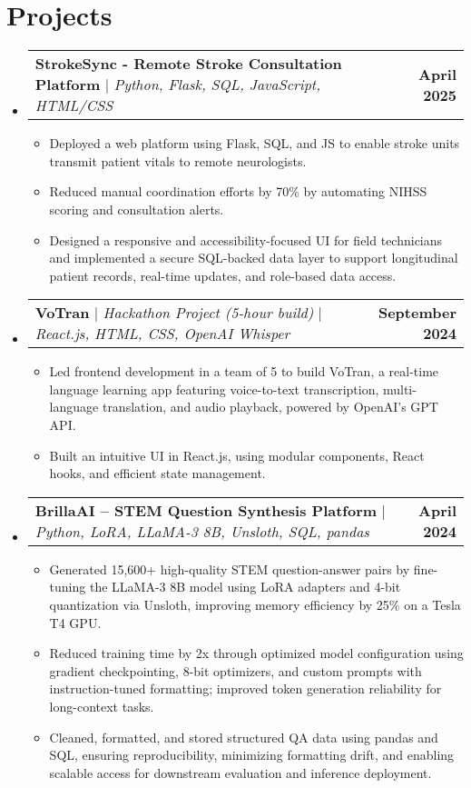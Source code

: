 \documentclass[letterpaper,11pt]{article}
\makeatletter
\newcommand{\resumeItem}[1]{
  \item\small{
    {#1 \vspace{-2pt}}
  }
}
\newcommand{\resumeProjectHeading}[2]{
    \item
    \begin{tabular*}{1.001\textwidth}{l@{\extracolsep{\fill}}r}
      \small#1 & \textbf{\small #2}\\
    \end{tabular*}\vspace{-7pt}
}
\newcommand{\resumeSubHeadingListStart}{\begin{itemize}[leftmargin=0.0in, label={}]}
\newcommand{\resumeSubHeadingListEnd}{\end{itemize}}
\newcommand{\resumeItemListStart}{\begin{itemize}}
\newcommand{\resumeItemListEnd}{\end{itemize}\vspace{-5pt}}
\makeatother
\begin{document}
\section{Projects}
    \vspace{-5pt}
    \resumeSubHeadingListStart
      \resumeProjectHeading
          {\textbf{StrokeSync - Remote Stroke Consultation Platform} $|$ \emph{Python, Flask, SQL, JavaScript, HTML/CSS}}{April 2025}
          \resumeItemListStart
            \resumeItem{Deployed a web platform using Flask, SQL, and JS to enable stroke units transmit patient vitals to remote neurologists.} 
            \resumeItem{Reduced manual coordination efforts by 70\% by automating NIHSS scoring and consultation alerts.}
            \resumeItem{Designed a responsive and accessibility-focused UI for field technicians and implemented a secure SQL-backed data layer to support longitudinal patient records, real-time updates, and role-based data access.} %
          \resumeItemListEnd
          \vspace{-13pt}
      \resumeProjectHeading
          {\textbf{VoTran} $|$ \emph{Hackathon Project (5-hour build)} $|$ \emph{React.js, HTML, CSS, OpenAI Whisper}}{September 2024} %
          \resumeItemListStart
            \resumeItem{Led frontend development in a team of 5 to build VoTran, a real-time language learning app featuring voice-to-text transcription, multi-language translation, and audio playback, powered by OpenAI’s GPT API.}
            \resumeItem{Built an intuitive UI in React.js, using modular components, React hooks, and efficient state management.}
          \resumeItemListEnd
          \vspace{-13pt}
      \resumeProjectHeading
          {\textbf{BrillaAI – STEM Question Synthesis Platform} $|$ \emph{Python, LoRA, LLaMA-3 8B, Unsloth, SQL, pandas}}{April 2024}
          \resumeItemListStart
            \resumeItem{Generated 15,600+ high-quality STEM question-answer pairs by fine-tuning the LLaMA-3 8B model using LoRA adapters and 4-bit quantization via Unsloth, improving memory efficiency by 25\% on a Tesla T4 GPU.}
            \resumeItem{Reduced training time by 2x through optimized model configuration using gradient checkpointing, 8-bit optimizers, and custom prompts with instruction-tuned formatting; improved token generation reliability for long-context tasks.}
            \resumeItem{Cleaned, formatted, and stored structured QA data using pandas and SQL, ensuring reproducibility, minimizing formatting drift, and enabling scalable access for downstream evaluation and inference deployment.}
          \resumeItemListEnd 
    \resumeSubHeadingListEnd
\end{document}
